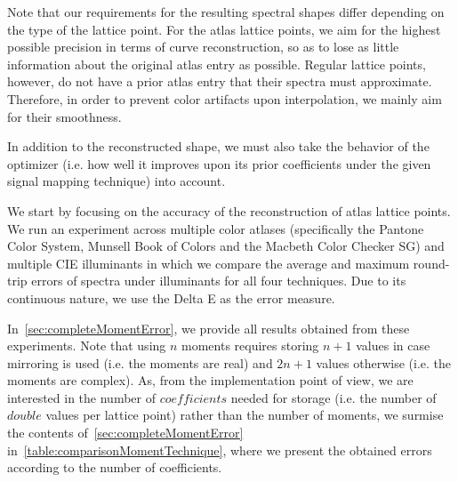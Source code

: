 Note that our requirements for the resulting spectral shapes differ depending on the type of the lattice point. For the atlas lattice points, we aim for the highest possible precision in terms of curve reconstruction, so as to lose as little information about the original atlas entry as possible. Regular lattice points, however, do not have a prior atlas entry that their spectra must approximate. Therefore, in order to prevent color artifacts upon interpolation, we mainly aim for their smoothness.

In addition to the reconstructed shape, we must also take the behavior of the optimizer (i.e. how well it improves upon its prior coefficients under the given signal mapping technique) into account.

We start by focusing on the accuracy of the reconstruction of atlas lattice points. We run an experiment across multiple color atlases (specifically the Pantone Color System, Munsell Book of Colors and the Macbeth Color Checker SG) and multiple CIE illuminants in which we compare the average and maximum round-trip errors of spectra under illuminants for all four techniques. Due to its continuous nature, we use the Delta E as the error measure.

In~\cref{sec:completeMomentError}, we provide all results obtained from these experiments. Note that using $n$ moments requires storing $n+1$ values in case mirroring is used (i.e. the moments are real) and $2n+1$ values otherwise (i.e. the moments are complex). As, from the implementation point of view, we are interested in the number of $coefficients$ needed for storage (i.e. the number of $double$ values per lattice point) rather than the number of moments, we surmise the contents of~\cref{sec:completeMomentError} in~\cref{table:comparisonMomentTechnique}, where we present the obtained errors according to the number of coefficients.

